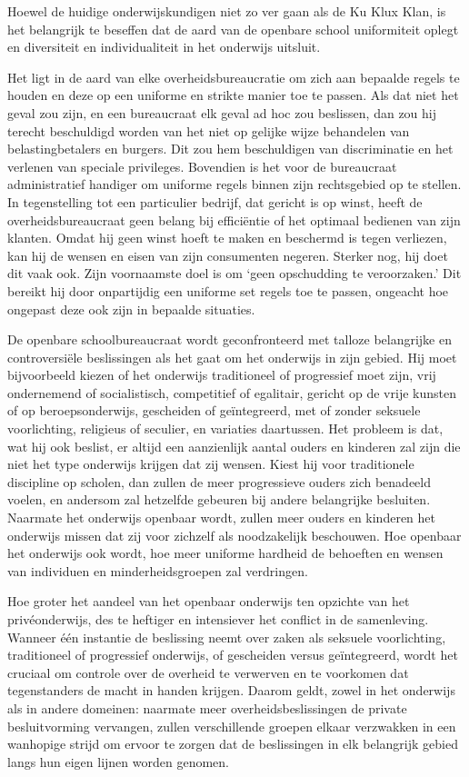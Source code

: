 \documentclass[
  a5paper,
  smalldemyvopaper,10pt,twoside,onecolumn,openright,extrafontsizes,hidelinks]{memoir}
\begin{document}
Hoewel de huidige onderwijskundigen niet zo ver gaan als de Ku Klux
Klan, is het belangrijk te beseffen dat de aard van de openbare school
uniformiteit oplegt en diversiteit en individualiteit in het onderwijs
uitsluit.

Het ligt in de aard van elke overheidsbureaucratie om zich aan bepaalde
regels te houden en deze op een uniforme en strikte manier toe te
passen. Als dat niet het geval zou zijn, en een bureaucraat elk geval ad
hoc zou beslissen, dan zou hij terecht beschuldigd worden van het niet
op gelijke wijze behandelen van belastingbetalers en burgers. Dit zou
hem beschuldigen van discriminatie en het verlenen van speciale
privileges. Bovendien is het voor de bureaucraat administratief handiger
om uniforme regels binnen zijn rechtsgebied op te stellen. In
tegenstelling tot een particulier bedrijf, dat gericht is op winst,
heeft de overheidsbureaucraat geen belang bij efficiëntie of het
optimaal bedienen van zijn klanten. Omdat hij geen winst hoeft te maken
en beschermd is tegen verliezen, kan hij de wensen en eisen van zijn
consumenten negeren. Sterker nog, hij doet dit vaak ook. Zijn
voornaamste doel is om `geen opschudding te veroorzaken.' Dit bereikt
hij door onpartijdig een uniforme set regels toe te passen, ongeacht hoe
ongepast deze ook zijn in bepaalde situaties.

De openbare schoolbureaucraat wordt geconfronteerd met talloze
belangrijke en controversiële beslissingen als het gaat om het onderwijs
in zijn gebied. Hij moet bijvoorbeeld kiezen of het onderwijs
traditioneel of progressief moet zijn, vrij ondernemend of
socialistisch, competitief of egalitair, gericht op de vrije kunsten of
op beroepsonderwijs, gescheiden of geïntegreerd, met of zonder seksuele
voorlichting, religieus of seculier, en variaties daartussen. Het
probleem is dat, wat hij ook beslist, er altijd een aanzienlijk aantal
ouders en kinderen zal zijn die niet het type onderwijs krijgen dat zij
wensen. Kiest hij voor traditionele discipline op scholen, dan zullen de
meer progressieve ouders zich benadeeld voelen, en andersom zal
hetzelfde gebeuren bij andere belangrijke besluiten. Naarmate het
onderwijs openbaar wordt, zullen meer ouders en kinderen het onderwijs
missen dat zij voor zichzelf als noodzakelijk beschouwen. Hoe openbaar
het onderwijs ook wordt, hoe meer uniforme hardheid de behoeften en
wensen van individuen en minderheidsgroepen zal verdringen.

Hoe groter het aandeel van het openbaar onderwijs ten opzichte van het
privéonderwijs, des te heftiger en intensiever het conflict in de
samenleving. Wanneer één instantie de beslissing neemt over zaken als
seksuele voorlichting, traditioneel of progressief onderwijs, of
gescheiden versus geïntegreerd, wordt het cruciaal om controle over de
overheid te verwerven en te voorkomen dat tegenstanders de macht in
handen krijgen. Daarom geldt, zowel in het onderwijs als in andere
domeinen: naarmate meer overheidsbeslissingen de private besluitvorming
vervangen, zullen verschillende groepen elkaar verzwakken in een
wanhopige strijd om ervoor te zorgen dat de beslissingen in elk
belangrijk gebied langs hun eigen lijnen worden genomen.
\end{document}
